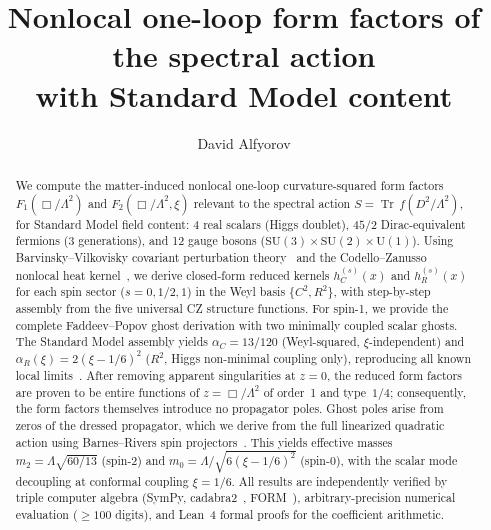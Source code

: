 \documentclass[aps,prd,twocolumn,superscriptaddress,nofootinbib,floatfix]{revtex4-2}
\theoremstyle{definition}
\theoremstyle{remark}
\newcommand{\Tr}{\operatorname{Tr}}
\begin{document}
\title{Nonlocal one-loop form factors of the spectral action\\with Standard Model content}

\author{David Alfyorov}

\begin{abstract}
We compute the matter-induced nonlocal one-loop curvature-squared form factors
$F_1(\Box/\Lambda^2)$ and $F_2(\Box/\Lambda^2,\xi)$ relevant to the spectral
action $S = \Tr\,f(D^2/\Lambda^2)$, for Standard Model field content:
4 real scalars (Higgs doublet), $45/2$ Dirac-equivalent fermions
(3 generations), and 12 gauge bosons
($\mathrm{SU}(3)\times\mathrm{SU}(2)\times\mathrm{U}(1)$).
Using Barvinsky--Vilkovisky covariant perturbation
theory~\cite{Barvinsky:1985an,Barvinsky:1987uw} and the Codello--Zanusso
nonlocal heat kernel~\cite{Codello:2012kq}, we derive closed-form reduced
kernels $h_C^{(s)}(x)$ and $h_R^{(s)}(x)$ for each spin sector
($s = 0, 1/2, 1$) in the Weyl basis $\{C^2, R^2\}$, with step-by-step
assembly from the five universal CZ structure functions. For spin-1, we provide
the complete Faddeev--Popov ghost derivation with two minimally coupled scalar
ghosts. The Standard Model assembly yields
$\alpha_C = 13/120$ (Weyl-squared, $\xi$-independent) and
$\alpha_R(\xi) = 2(\xi - 1/6)^2$ ($R^2$, Higgs non-minimal coupling only),
reproducing all known local
limits~\cite{Gilkey:1975iq,Vassilevich:2003xt,Codello:2008vh,Stelle:1976gc}.
After removing apparent singularities at $z = 0$, the reduced form factors
are proven to be entire functions of $z = \Box/\Lambda^2$ of order~1 and
type~$1/4$; consequently, the form factors themselves introduce no propagator
poles. Ghost poles arise from zeros of the dressed propagator, which we derive
from the full linearized quadratic action using Barnes--Rivers spin
projectors~\cite{Barnes:1965,Rivers:1964}. This yields effective masses
$m_2 = \Lambda\sqrt{60/13}$ (spin-2) and
$m_0 = \Lambda/\sqrt{6(\xi - 1/6)^2}$ (spin-0), with the scalar mode
decoupling at conformal coupling $\xi = 1/6$.
All results are independently verified by triple computer algebra
(SymPy, cadabra2~\cite{Peeters:2007wn}, FORM~\cite{Vermaseren:2000nd}),
arbitrary-precision numerical evaluation ($\geq 100$ digits), and Lean~4
formal proofs for the coefficient arithmetic.
\end{abstract}

\end{document}
